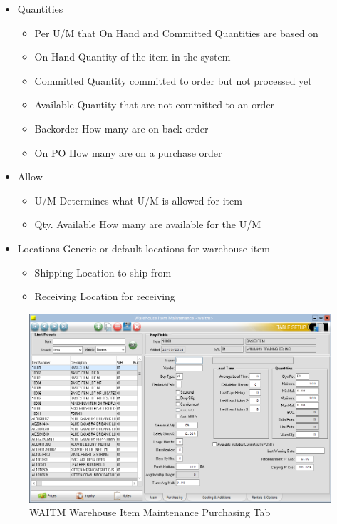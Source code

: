 \begin{enumerate}
\begin{itemize}
		\item Quantities
		\begin{itemize}
			\item Per \textemdash U/M that On Hand and Committed Quantities are based on
			\item On Hand \textemdash Quantity of the item in the system
			\item Committed \textemdash Quantity committed to order but not processed yet
			\item Available \textemdash Quantity that are not committed to an order
			\item Backorder \textemdash How many are on back order
			\item On PO \textemdash How many are on a purchase order
		\end{itemize}
		\item Allow
		\begin{itemize}
			\item U/M \textemdash Determines what U/M is allowed for item
			\item Qty. Available \textemdash How many are available for the U/M
		\end{itemize}
		\item Locations \textemdash Generic or default locations for warehouse item
		\begin{itemize}
			\item Shipping \textemdash Location to ship from
			\item Receiving \textemdash Location for receiving
		\end{itemize}
	\end{itemize}
		
	\begin{figure}[H]
		\includegraphics[width=\textwidth]{../img/image63}
		\caption{WAITM Warehouse Item Maintenance Purchasing Tab}
	\end{figure}
		

\end{enumerate}
